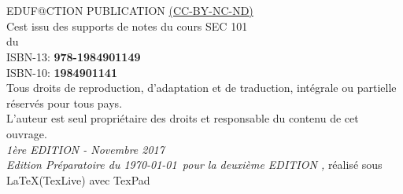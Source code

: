 


\newpage

~\vfill
\thispagestyle{empty}

\noindent {\Huge\ccbyncndeu}\\ 

 EDUF@CTION PUBLICATION \href{https://creativecommons.org/licenses/by-nc-nd/2.0/fr/}{(CC-BY-NC-ND)}\\ %

\noindent C\edoc est issu des supports de notes du cours SEC 101\\ 
du \uCnam \\

\noindent ISBN-13: \textbf{978-1984901149} \\

\noindent ISBN-10: \textbf{1984901141} \\

\noindent Tous droits de reproduction, d’adaptation et de traduction, intégrale ou partielle réservés pour tous pays.\\

\noindent L’auteur est seul propriétaire des droits et responsable du contenu de cet ouvrage.\\

\noindent \textit{1ère EDITION - Novembre 2017} \\

\noindent \textit{Edition Préparatoire du \today~pour la deuxième EDITION  \printer, } réalisé sous \LaTeX (TexLive) avec TexPad \faApple